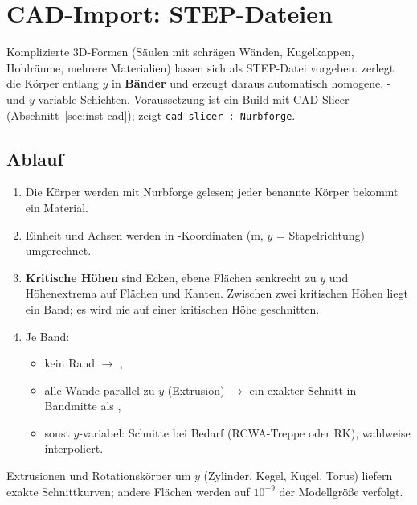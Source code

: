 \chapter{CAD-Import: STEP-Dateien}\label{ch:cad}
%

Komplizierte 3D-Formen (Säulen mit schrägen Wänden, Kugelkappen, Hohlräume, mehrere Materialien) lassen sich als
STEP-Datei vorgeben. \FG{} zerlegt die Körper entlang $y$ in \textbf{Bänder} und erzeugt daraus automatisch
homogene, - und $y$-variable Schichten. Voraussetzung ist ein Build mit CAD-Slicer
(Abschnitt~\ref{sec:inst-cad});  zeigt \texttt{cad slicer : Nurbforge}.

\section{Ablauf}
\begin{center}
\end{center}
\begin{enumerate}
  \item Die Körper werden mit Nurbforge gelesen; jeder benannte Körper bekommt ein Material.
  \item Einheit und Achsen werden in \FG-Koordinaten (\textmu m, $y$ = Stapelrichtung) umgerechnet.
  \item \textbf{Kritische Höhen} sind Ecken, ebene Flächen senkrecht zu $y$ und Höhenextrema auf Flächen und Kanten.
        Zwischen zwei kritischen Höhen liegt ein Band; es wird nie auf einer kritischen Höhe geschnitten.
  \item Je Band:
  \begin{itemize}
    \item kein Rand $\to$ ,
    \item alle Wände parallel zu $y$ (Extrusion) $\to$ ein exakter Schnitt in Bandmitte als ,
    \item sonst $y$-variabel: Schnitte bei Bedarf (RCWA-Treppe oder RK), wahlweise interpoliert.
  \end{itemize}
\end{enumerate}
Extrusionen und Rotationskörper um $y$ (Zylinder, Kegel, Kugel, Torus) liefern exakte Schnittkurven; andere Flächen
werden auf $10^{-9}$ der Modellgröße verfolgt.

